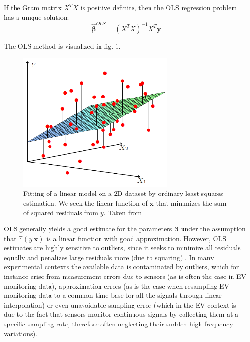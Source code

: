 If the Gram matrix $X^T X$ is positive definite, then the OLS regression problem has a unique solution:
\begin{equation}
\hat{\bm{\beta}}^{OLS} = (X^TX)^{-1}X^T\mathbf{y}
\end{equation}

The OLS method is visualized in fig. \ref{fig:ols}.

\begin{figure}[hbt!]
    \centering
    \includegraphics[width=0.7\textwidth]{images/ols}
    \caption[Fitting a linear model via OLS]{Fitting of a linear model on a 2D dataset by ordinary least squares estimation. We seek the linear function of $\mathbf{x}$ that minimizes the sum of squared residuals from $y$. Taken from \cite{hastie}}
    \label{fig:ols}
\end{figure}

OLS generally yields a good estimate for the parameters $\bm{\beta}$ under the assumption that $\mathbb{E}(y|\mathbf{x})$ is a linear function with good approximation. However, OLS estimates are highly sensitive to outliers, since it seeks to minimize all residuals equally and penalizes large residuals more (due to squaring) \cite{robust_regr}. In many experimental contexts the available data is contaminated by outliers, which for instance arise from measurement errors due to sensors (as is often the case in EV monitoring data), approximation errors (as is the case when resampling EV monitoring data to a common time base for all the signals through linear interpolation) or even unavoidable sampling error (which in the EV context is due to the fact that sensors monitor continuous signals by collecting them at a specific sampling rate, therefore often neglecting their sudden high-frequency variations).

